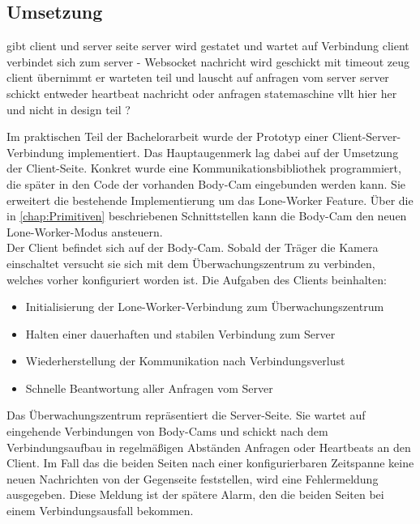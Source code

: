 \documentclass[thesis.tex]{subfiles}
\begin{document}
\subsection{Umsetzung}

gibt client und server seite
server wird gestatet und wartet auf Verbindung
client verbindet sich zum server - Websocket
nachricht wird geschickt mit timeout zeug
client übernimmt er warteten teil und lauscht auf anfragen vom server
server schickt entweder heartbeat nachricht oder anfragen
statemaschine vllt hier her und nicht in design teil ?

Im praktischen Teil der Bachelorarbeit wurde der Prototyp einer Client-Server-Verbindung implementiert.
Das Hauptaugenmerk lag dabei auf der Umsetzung der Client-Seite.
Konkret wurde eine Kommunikationsbibliothek programmiert, die später in den Code der vorhanden Body-Cam eingebunden werden kann.
Sie erweitert die bestehende Implementierung um das Lone-Worker Feature.
Über die in \autoref{chap:Primitiven} beschriebenen Schnittstellen kann die Body-Cam den neuen Lone-Worker-Modus ansteuern.
\\

Der Client befindet sich auf der Body-Cam.
Sobald der Träger die Kamera einschaltet versucht sie sich mit dem Überwachungszentrum zu verbinden, welches vorher konfiguriert worden ist.
Die Aufgaben des Clients beinhalten:
\begin{itemize}
    \item Initialisierung der Lone-Worker-Verbindung zum Überwachungszentrum
    \item Halten einer dauerhaften und stabilen Verbindung zum Server
    \item Wiederherstellung der Kommunikation nach Verbindungsverlust
    \item Schnelle Beantwortung aller Anfragen vom Server
\end{itemize}

Das Überwachungszentrum repräsentiert die Server-Seite.
Sie wartet auf eingehende Verbindungen von Body-Cams und schickt nach dem Verbindungsaufbau in regelmäßigen Abständen Anfragen oder Heartbeats an den Client.
Im Fall das die beiden Seiten nach einer konfigurierbaren Zeitspanne keine neuen Nachrichten von der Gegenseite feststellen, wird eine Fehlermeldung ausgegeben.
Diese Meldung ist der spätere Alarm, den die beiden Seiten bei einem Verbindungsausfall bekommen.
\\
\end{document}
